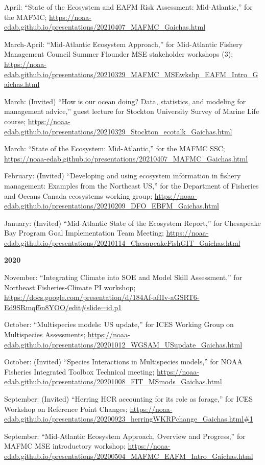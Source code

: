 \documentclass[11pt, a4paper]{awesome-cv}
\begin{document}
April: ``State of the Ecosystem and EAFM Risk Assessment:
Mid-Atlantic,'' for the MAFMC;
\url{https://noaa-edab.github.io/presentations/20210407_MAFMC_Gaichas.html}

March-April: ``Mid-Atlantic Ecosystem Approach,'' for Mid-Atlantic
Fishery Management Council Summer Flounder MSE stakeholder workshops
(3);
\url{https://noaa-edab.github.io/presentations/20210329_MAFMC_MSEwkshp_EAFM_Intro_Gaichas.html}

March: (Invited) ``How is our ocean doing? Data, statistics, and
modeling for management advice,'' guest lecture for Stockton University
Survey of Marine Life course;
\url{https://noaa-edab.github.io/presentations/20210329_Stockton_ecotalk_Gaichas.html}

March: ``State of the Ecosystem: Mid-Atlantic,'' for the MAFMC SSC;
\url{https://noaa-edab.github.io/presentations/20210407_MAFMC_Gaichas.html}

February: (Invited) ``Developing and using ecosystem information in
fishery management: Examples from the Northeast US,'' for the Department
of Fisheries and Oceans Canada ecosystems working group;
\url{https://noaa-edab.github.io/presentations/20210209_DFO_EBFM_Gaichas.html}

January: (Invited) ``Mid-Atlantic State of the Ecosystem Report,'' for
Chesapeake Bay Program Goal Implementation Team Meeting;
\url{https://noaa-edab.github.io/presentations/20210114_ChesapeakeFishGIT_Gaichas.html}

\textbf{2020}

November: ``Integrating Climate into SOE and Model Skill Assessment,''
for Northeast Fisheries-Climate PI workshop;
\url{https://docs.google.com/presentation/d/184Af-afIIv-aGSRT6-Ed9SRmqf5n8YOO/edit\#slide=id.p1}

October: ``Multispecies models: US update,'' for ICES Working Group on
Multispecies Assessments;
\url{https://noaa-edab.github.io/presentations/20201012_WGSAM_USupdate_Gaichas.html}

October: (Invited) ``Species Interactions in Multispecies models,'' for
NOAA Fisheries Integrated Toolbox Technical meeting;
\url{https://noaa-edab.github.io/presentations/20201008_FIT_MSmods_Gaichas.html}

September: (Invited) ``Herring HCR accounting for its role as forage,''
for ICES Workshop on Reference Point Changes;
\url{https://noaa-edab.github.io/presentations/20200923_herringWKRPchange_Gaichas.html\#1}

September: ``Mid-Atlantic Ecosystem Approach, Overview and Progress,''
for MAFMC MSE introductory workshop;
\url{https://noaa-edab.github.io/presentations/20200504_MAFMC_EAFM_Intro_Gaichas.html}
\end{document}
